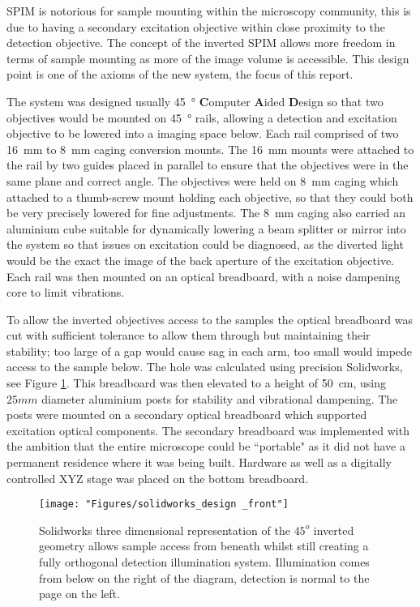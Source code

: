 \documentclass[10pt,a4paper]{report}
\begin{document}
\begin{spacing}{1.5}
SPIM is notorious for sample mounting within the microscopy community, this is due to having a secondary excitation objective within close proximity to the detection objective. The concept of the inverted SPIM \cite{Wu2011} allows more freedom in terms of sample mounting as more of the image volume is accessible. This design point is one of the axioms of the new system, the focus of this report.

The system was designed usually \SI{45}{\degree} \textbf{C}omputer \textbf{A}ided \textbf{D}esign so that two objectives would be mounted on \SI{45}{\degree} rails, allowing a detection and excitation objective to be lowered into a imaging space below. Each rail comprised of two \SI{16}{\milli\meter} to \SI{8}{\milli\meter} caging conversion mounts. The \SI{16}{\milli\meter} mounts were attached to the rail by two guides placed in parallel to ensure that the objectives were in the same plane and correct angle. The objectives were held on \SI{8}{\milli\meter} caging which attached to a thumb-screw mount holding each objective, so that they could both be very precisely lowered for fine adjustments. The \SI{8}{\milli\meter} caging also carried an aluminium cube suitable for dynamically lowering a beam splitter or mirror into the system so that issues on excitation could be diagnosed, as the diverted light would be the exact the image of the back aperture of the excitation objective. Each rail was then mounted on an optical breadboard, with a noise dampening core to limit vibrations.

To allow the inverted objectives access to the samples the optical breadboard was cut with sufficient tolerance to allow them through but maintaining their stability; too large of a gap would cause sag in each arm, too small would impede access to the sample below. The hole was calculated using precision Solidworks, see Figure \ref{fig:solidworks_design_front}. This breadboard was then elevated to a height of \SI{50}{\centi\meter}, using $25mm$ diameter aluminium posts for stability and vibrational dampening. The posts were mounted on a secondary optical breadboard which supported excitation optical components. The secondary breadboard was implemented with the ambition that the entire microscope could be ``portable" as it did not have a permanent residence where it was being built. Hardware as well as a digitally controlled XYZ stage was placed on the bottom breadboard.

\begin{figure}
\centering
\texttt{[image: "Figures/solidworks\_design \_front"]}
\caption[CAD design of the $45^o$ detection and excitation]{Solidworks three dimensional representation of the $45^o$ inverted geometry allows sample access from beneath whilst still creating a fully orthogonal detection illumination system. Illumination comes from below on the right of the diagram, detection is normal to the page on the left.}
\label{fig:solidworks_design_front}
\end{figure}


\end{spacing}
\end{document}
